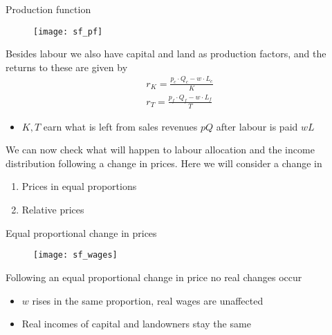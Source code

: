 \documentclass{beamer}
\begin{document}
\begin{frame}{Production function}
  \begin{figure}
    \texttt{[image: sf\_pf]}
  \end{figure}    
\end{frame}

\begin{frame}
  Besides labour we also have capital and land as production factors, and the returns to these are given by
  \begin{align*}
    r_K = \frac{p_c \cdot Q_c -w \cdot L_c}{K}\\
    r_T = \frac{p_f \cdot Q_f - w \cdot L_f}{T}
  \end{align*}
  \begin{itemize}
    \item $K, T$ earn what is left from sales revenues $pQ$ after labour is paid $wL$
  \end{itemize}
\end{frame}

\begin{frame}
  We can now check what will happen to labour allocation and the income distribution following a change in prices.
  Here we will consider a change in 
  \begin{enumerate}
    \item Prices in equal proportions
    \item Relative prices
  \end{enumerate}
\end{frame}

\begin{frame}{Equal proportional change in prices}
  \begin{figure}
    \texttt{[image: sf\_wages]}
  \end{figure}
\end{frame}

\begin{frame}
  Following an equal proportional change in price no real changes occur
  \begin{itemize}
    \item $w$ rises in the same proportion, real wages are unaffected
    \item Real incomes of capital and landowners stay the same
  \end{itemize}
\end{frame}
\end{document}
